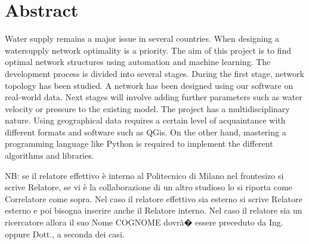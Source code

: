 ﻿\newpage
\chapter*{Abstract}


Water supply remains a major issue in several countries. When designing a watersupply
network optimality is a priority. The aim of this project is to find optimal network
structures using automation and machine learning.
The development process is divided into several stages. During the first stage, network
topology has been studied. A network has been designed using our software on real-world
data. Next stages will involve adding further parameters such as water velocity or pressure
to the existing model.
The project has a multidisciplinary nature. Using geographical data requires a certain level
of acquaintance with different formats and software such as QGis. On the other hand,
mastering a programming language like Python is required to implement the different
algorithms and libraries.

\vspace{0.5cm}
\noindent NB: se il relatore effettivo \`e interno al Politecnico di Milano nel frontesizo si scrive Relatore, se vi \`e la collaborazione di un altro studioso lo si riporta come Correlatore come sopra. Nel caso il relatore effettivo sia esterno si scrive Relatore esterno e poi bisogna inserire anche il Relatore interno. Nel caso il relatore sia un ricercatore allora il suo Nome COGNOME dovr\`a� essere preceduto da Ing. oppure Dott., a seconda dei casi.
